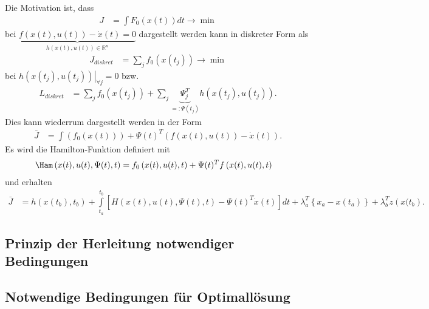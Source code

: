 Die Motivation ist, dass 
\begin{align*}
	J & = \int F_0(x(t))dt \rightarrow \min
\end{align*}
bei $\underbrace{f\left(x(t), u(t) \right)-\dot{x}(t)=0 }_{h\left(x(t),u(t) \right)\in\mathbb{R}^n }$ dargestellt werden kann in diskreter Form als
\begin{align*}
	J_{diskret} & = \sum\limits_j f_0(x(t_j))\rightarrow \min 
\end{align*}
bei $\left. h\left(x(t_j),u(t_j) \right)\right|_{\forall j}=0$ bzw.
\begin{align*}
	L_{diskret} & = \sum\limits_j f_0(x(t_j)) + \sum\limits_j \underbrace{\Psi_j^T}_{=:\Psi(t_j)} h\left(x(t_j),u(t_j) \right).
\end{align*}
Dies kann wiederrum dargestellt werden in der Form
\begin{align*}
	\bar{J} & = \int\left(f_0(x(t)) \right) + \Psi(t)^T\left(f(x(t),u(t))-\dot{x}(t) \right).
\end{align*}
Es wird die Hamilton-Funktion definiert mit
\begin{align*}
	\Ham\left(x(t),u(t),\Psi(t),t \right) & = f_0\left(x(t),u(t),t \right) + \Psi(t)^T f\left(x(t),u(t),t \right)
\end{align*}
und erhalten 
\begin{align}
	\bar{J} & = h\left(x(t_b),t_b \right) + \int\limits_{t_a}^{t_b}\left[H\left(x(t),u(t),\Psi(t),t \right)-\Psi(t)^T\dot{x}(t) \right]dt
	+\lambda_a^T\left\{x_a-x(t_a) \right\} + \lambda_b^T z\left(x(t_b\right).
\end{align}

\subsection{Prinzip der Herleitung notwendiger Bedingungen}

\subsection{Notwendige Bedingungen für Optimallösung}

